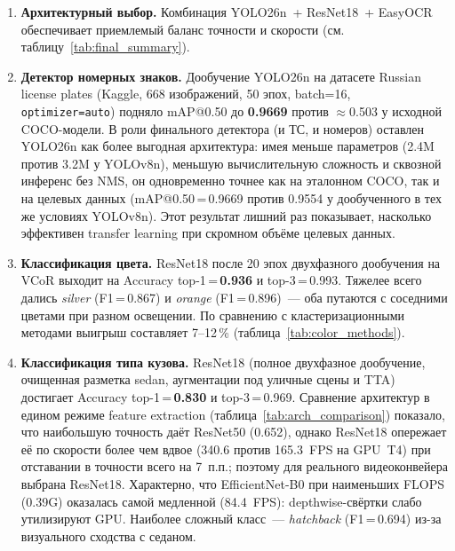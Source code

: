 \documentclass[10pt,a4paper]{report}
\numberwithin{equation}{chapter}
\numberwithin{figure}{chapter}
\numberwithin{table}{chapter}
\begin{document}
\begin{enumerate}
  \item \textbf{Архитектурный выбор.}
        Комбинация YOLO26n~+ ResNet18~+ EasyOCR обеспечивает приемлемый баланс
        точности и скорости (см. таблицу~\ref{tab:final_summary}).

  \item \textbf{Детектор номерных знаков.}
        Дообучение YOLO26n на датасете Russian license plates (Kaggle,
        668 изображений, 50 эпох, batch=16, \texttt{optimizer=auto})
        подняло mAP@0.50 до \textbf{0.9669} против $\approx$0.503 у
        исходной COCO-модели. В роли финального детектора (и ТС, и
        номеров) оставлен YOLO26n как более выгодная архитектура: имея
        меньше параметров (2.4M против 3.2M у YOLOv8n), меньшую
        вычислительную сложность и сквозной инференс без NMS, он
        одновременно точнее как на эталонном COCO, так и на целевых
        данных (mAP@0.50\,=\,0.9669 против 0.9554 у дообученного в тех же
        условиях YOLOv8n). Этот результат лишний раз показывает, насколько
        эффективен transfer learning при скромном объёме целевых данных.

  \item \textbf{Классификация цвета.}
        ResNet18 после 20 эпох двухфазного дообучения на VCoR выходит на
        Accuracy top-1\,=\,\textbf{0.936} и top-3\,=\,0.993. Тяжелее всего
        дались \textit{silver} (F1\,=\,0.867) и \textit{orange}
        (F1\,=\,0.896)~--- оба путаются с соседними цветами при разном
        освещении. По сравнению с кластеризационными методами выигрыш
        составляет 7--12\,\% (таблица~\ref{tab:color_methods}).

  \item \textbf{Классификация типа кузова.}
        ResNet18 (полное двухфазное дообучение, очищенная разметка
        sedan, аугментации под уличные сцены и TTA) достигает
        Accuracy top-1\,=\,\textbf{0.830} и top-3\,=\,0.969.
        Сравнение архитектур в едином режиме feature extraction
        (таблица~\ref{tab:arch_comparison}) показало, что наибольшую
        точность даёт ResNet50 (0.652), однако ResNet18 опережает
        её по скорости более чем вдвое (340.6 против 165.3~FPS на GPU~T4)
        при отставании в точности всего на 7~п.п.; поэтому для
        реального видеоконвейера выбрана ResNet18. Характерно, что
        EfficientNet-B0 при наименьших FLOPS (0.39G) оказалась самой
        медленной (84.4~FPS): depthwise-свёртки слабо утилизируют GPU.
        Наиболее сложный класс~--- \textit{hatchback} (F1\,=\,0.694)
        из-за визуального сходства с седаном.


\end{enumerate}
\end{document}

